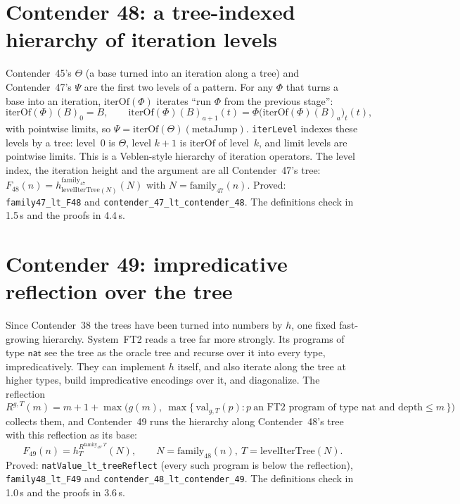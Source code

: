\documentclass[11pt]{article}
\theoremstyle{definition}
\theoremstyle{remark}
\newcommand{\lean}[1]{\texttt{#1}}
\begin{document}
\section{Contender 48: a tree-indexed hierarchy of iteration levels}

Contender~45's $\Theta$ (a base turned into an iteration along a tree) and
Contender~47's $\Psi$ are the first two levels of a pattern. For any $\Phi$
that turns a base into an iteration, $\mathrm{iterOf}(\Phi)$ iterates ``run
$\Phi$ from the previous stage'':
\[
\mathrm{iterOf}(\Phi)(B)_0=B,\qquad
\mathrm{iterOf}(\Phi)(B)_{a+1}(t)=\Phi\bigl(\mathrm{iterOf}(\Phi)(B)_a\bigr)_t(t),
\]
with pointwise limits, so $\Psi=\mathrm{iterOf}(\Theta)(\mathrm{metaJump})$.
\lean{iterLevel} indexes these levels by a tree: level~0 is $\Theta$, level
$k{+}1$ is $\mathrm{iterOf}$ of level~$k$, and limit levels are pointwise
limits. This is a Veblen-style hierarchy of iteration operators. The level
index, the iteration height and the argument are all Contender~47's tree:
$F_{48}(n)=h^{\mathrm{family}_{47}}_{\mathrm{levelIterTree}(N)}(N)$ with
$N=\mathrm{family}_{47}(n)$. Proved: \lean{family47\_lt\_F48} and
\lean{contender\_47\_lt\_\allowbreak contender\_48}. The definitions check in
1.5\,s and the proofs in 4.4\,s.

\section{Contender 49: impredicative reflection over the tree}

Since Contender~38 the trees have been turned into numbers by $h$, one fixed
fast-growing hierarchy. System~FT2 reads a tree far more strongly. Its
programs of type $\mathsf{nat}$ see the tree as the oracle tree and recurse
over it into every type, impredicatively. They can implement $h$ itself, and
also iterate along the tree at higher types, build impredicative encodings over
it, and diagonalize. The reflection
\[
R^{g,T}(m)=m+1+\max\bigl(g(m),\ \max\{\,\mathrm{val}_{g,T}(p) : p\ \text{an FT2 program of type nat and depth}\le m\,\}\bigr)
\]
collects them, and Contender~49 runs the hierarchy along Contender~48's tree
with this reflection as its base:
\[
F_{49}(n)=h^{R^{\mathrm{family}_{48},T}}_{T}(N),\qquad N=\mathrm{family}_{48}(n),\ T=\mathrm{levelIterTree}(N).
\]
Proved: \lean{natValue\_lt\_treeReflect} (every such program is below the
reflection), \lean{family48\_lt\_F49} and
\lean{contender\_48\_lt\_\allowbreak contender\_49}. The definitions check in
1.0\,s and the proofs in 3.6\,s.
\end{document}
